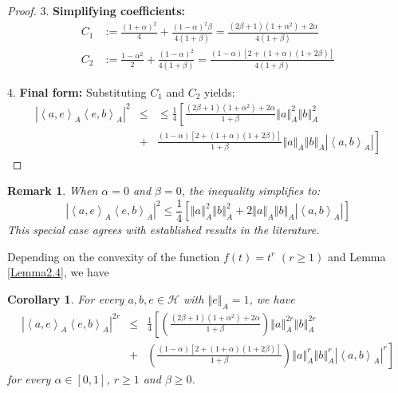 \documentclass{article}
\newcommand{\bra}[1]{\left(#1\right)}
\newcommand{\sbra}[1]{\left[#1\right]}
\newcommand{\seqA}[1]{{\left<#1\right>}_{A}}
\newcommand{\normA}[1]{{\left\Vert#1\right\Vert}_{A}}
\newcommand{\abs}[1]{\left\vert#1\right\vert}
\newcommand {\h}{\mathcal{H}}
\newtheorem{corollary}[theorem]{Corollary}
\newtheorem{remark}[theorem]{Remark}
\begin{document}
\begin{proof}
3. \textbf{Simplifying coefficients:}
\begin{align*}
C_1 &:= \frac{(1+\alpha)^2}{4} + \frac{(1-\alpha)^2\beta}{4(1+\beta)} = \frac{(2\beta+1)(1+\alpha^2)+2\alpha}{4(1+\beta)} \\
C_2 &:= \frac{1-\alpha^2}{2} + \frac{(1-\alpha)^2}{4(1+\beta)} = \frac{(1-\alpha)[2+(1+\alpha)(1+2\beta)]}{4(1+\beta)}
\end{align*}

4. \textbf{Final form:}
Substituting $C_1$ and $C_2$ yields:
\begin{eqnarray*}
  \abs{\seqA{a,e}\seqA{e,b}}^2 &\leq&\leq \frac{1}{4}\left[\frac{(2\beta+1)(1+\alpha^2)+2\alpha}{1+\beta}\normA{a}^2\normA{b}^2\right. \\
   &+&\left.\frac{(1-\alpha)[2+(1+\alpha)(1+2\beta)]}{1+\beta}\normA{a}\normA{b}\abs{\seqA{a,b}}\right]
\end{eqnarray*}
\end{proof}
\begin{remark}
When $\alpha = 0$ and $\beta = 0$, the inequality simplifies to:
\begin{equation*}
\abs{\seqA{a,e}\seqA{e,b}}^2 \leq \frac{1}{4}\left[\normA{a}^2\normA{b}^2 + 2\normA{a}\normA{b}\abs{\seqA{a,b}}\right]
\end{equation*}
This special case agrees with established results in the literature.
\end{remark}
Depending on the convexity of the function $f(t)=t^r$ $(r\geq 1)$ and Lemma \ref{Lemma2.4}, we have
\begin{corollary}\label{COLLORY-ONE} For every $a,b,e\in\h$ with $\normA{e}=1$, we have
\begin{eqnarray}
  \abs{\seqA{a,e}\seqA{e,b}}^{2r}&\leq& \frac{1}{4}\left[\bra{\frac{(2\beta+1)(1+\alpha^2)+2\alpha}{1+\beta}}\normA{a}^{2r}\normA{b}^{2r}\right.\nonumber \\
  &+&\left.\bra{\frac{\bra{1-\alpha}\sbra{2+(1+\alpha)(1+2\beta)}}{1+\beta}}\normA{a}^{r}\normA{b}^{r}\abs{\seqA{a,b}}^{r}\right]
\end{eqnarray}
for every $\alpha\in [0,1]$, $r\geq 1$ and $\beta\geq 0$.

\end{corollary}
\end{document}
